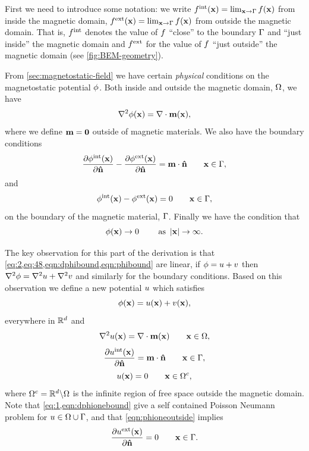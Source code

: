 First we need to introduce some notation: we write $f^{\mathrm{int}}(\boldsymbol{\mathrm{x}}) = \lim_{\boldsymbol{\mathrm{x}} \rightarrow {\Gamma}} f(\boldsymbol{\mathrm{x}})$ from inside the magnetic domain, $f^{\mathrm{ext}}(\boldsymbol{\mathrm{x}}) = \lim_{\boldsymbol{\mathrm{x}} \rightarrow {\Gamma}} f(\boldsymbol{\mathrm{x}})$ from outside the magnetic domain.
That is, $f^{\mathrm{int}}$ denotes the value of $f$ ``close'' to the boundary ${\Gamma}$ and ``just inside'' the magnetic domain and $f^{\mathrm{ext}}$ for the value of $f$ ``just outside'' the magnetic domain (see \cref{fig:BEM-geometry}).

From \cref{sec:magnetostatic-field} we have certain \emph{physical} conditions on the magnetostatic potential $\phi$.
Both inside and outside the magnetic domain, $\Omega$, we have
\begin{equation}
  \nabla^2 \phi(\boldsymbol{\mathrm{x}}) = \nabla \cdot \boldsymbol{\mathrm{m}}(\boldsymbol{\mathrm{x}}),
  \label{eq:2}
\end{equation}
where we define $\boldsymbol{\mathrm{m}} = \mathbf{0}$ outside of magnetic materials.
We also have the boundary conditions
\begin{equation}
  \frac{\partial \phi^{\mathrm{int}}(\boldsymbol{\mathrm{x}})}{\partial \boldsymbol{\mathrm{\hat{n}}}} - \frac{\partial \phi^{\mathrm{ext}}(\boldsymbol{\mathrm{x}})}{\partial \boldsymbol{\mathrm{\hat{n}}}} = \boldsymbol{\mathrm{m}} \cdot \boldsymbol{\mathrm{\hat{n}}} \qquad \boldsymbol{\mathrm{x}} \in {\Gamma},
  \label{eqn:dphibound}
\end{equation}
and
\begin{equation}
  \phi^{\mathrm{int}}(\boldsymbol{\mathrm{x}}) - \phi^{\mathrm{ext}}(\boldsymbol{\mathrm{x}})  = 0 \qquad \boldsymbol{\mathrm{x}} \in {\Gamma},
  \label{eqn:phibound}
\end{equation}
on the boundary of the magnetic material, ${\Gamma}$.
Finally we have the condition that
\begin{equation}
  \phi(\boldsymbol{\mathrm{x}}) \rightarrow 0 \qquad \text{ as } \left|{\boldsymbol{\mathrm{x}}} \right| \rightarrow \infty.
  \label{eq:48}
\end{equation}

The key observation for this part of the derivation is that \cref{eq:2,eq:48,eqn:dphibound,eqn:phibound} are linear, \ie if $\phi = u + v$ then $\nabla^2 \phi = \nabla^2 u + \nabla^2 v$ and similarly for the boundary conditions.
Based on this observation we define a new potential $u$ which satisfies
\begin{equation}
  \phi(\boldsymbol{\mathrm{x}}) = u(\boldsymbol{\mathrm{x}}) + v(\boldsymbol{\mathrm{x}}),
  \label{eq:21}
\end{equation}
everywhere in $\mathbb{R}^d$ and
\begin{equation}
  \nabla^2 u(\boldsymbol{\mathrm{x}}) = \nabla \cdot \boldsymbol{\mathrm{m}}(\boldsymbol{\mathrm{x}}) \qquad \boldsymbol{\mathrm{x}} \in \Omega,
  \label{eq:1}
\end{equation}
\begin{equation}
  \frac{\partial u^{\mathrm{int}}(\boldsymbol{\mathrm{x}})}{\partial \boldsymbol{\mathrm{\hat{n}}}} = \boldsymbol{\mathrm{m}} \cdot \boldsymbol{\mathrm{\hat{n}}} \qquad \boldsymbol{\mathrm{x}} \in {\Gamma},
  \label{eqn:dphionebound}
\end{equation}
\begin{equation}
  u(\boldsymbol{\mathrm{x}}) = 0 \qquad \boldsymbol{\mathrm{x}} \in {\Omega^c},
  \label{eqn:phioneoutside}
\end{equation}
where ${\Omega^c} = \mathbb{R}^d \backslash \Omega$ is the infinite region of free space outside the magnetic domain.
Note that \cref{eq:1,eqn:dphionebound} give a self contained Poisson Neumann problem for $u \in \Omega \cup {\Gamma}$, and that \cref {eqn:phioneoutside} implies
\begin{equation}
  \frac{\partial u^{\mathrm{ext}}(\boldsymbol{\mathrm{x}})}{\partial \boldsymbol{\mathrm{\hat{n}}}} = 0 \qquad \boldsymbol{\mathrm{x}} \in {\Gamma}.
  \label{eq:32}
\end{equation}


